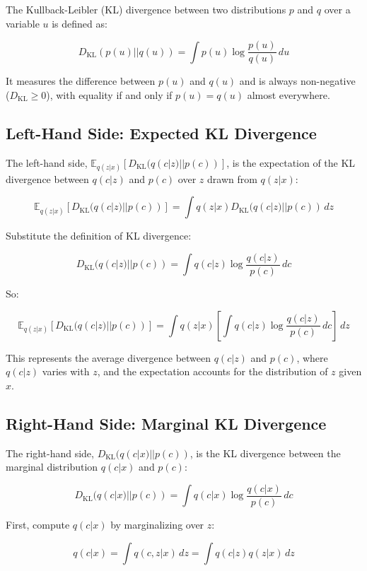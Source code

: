 \documentclass[12pt]{article}
\numberwithin{equation}{section}
\begin{document}
The Kullback-Leibler (KL) divergence between two distributions \( p \) and \( q \) over a variable \( u \) is defined as:

\[
D_{\text{KL}}(p(u) || q(u)) = \int p(u) \log \frac{p(u)}{q(u)} \, du
\]

It measures the difference between \( p(u) \) and \( q(u) \) and is always non-negative (\( D_{\text{KL}} \geq 0 \)), with equality if and only if \( p(u) = q(u) \) almost everywhere.

\subsection{Left-Hand Side: Expected KL Divergence}

The left-hand side, \(\mathbb{E}_{q(z|x)} \left[ D_{\text{KL}}(q(c|z) || p(c)) \right]\), is the expectation of the KL divergence between \( q(c|z) \) and \( p(c) \) over \( z \) drawn from \( q(z|x) \):

\[
\mathbb{E}_{q(z|x)} \left[ D_{\text{KL}}(q(c|z) || p(c)) \right] = \int q(z|x) D_{\text{KL}}(q(c|z) || p(c)) \, dz
\]

Substitute the definition of KL divergence:

\[
D_{\text{KL}}(q(c|z) || p(c)) = \int q(c|z) \log \frac{q(c|z)}{p(c)} \, dc
\]

So:

\[
\mathbb{E}_{q(z|x)} \left[ D_{\text{KL}}(q(c|z) || p(c)) \right] = \int q(z|x) \left[ \int q(c|z) \log \frac{q(c|z)}{p(c)} \, dc \right] \, dz
\]

This represents the average divergence between \( q(c|z) \) and \( p(c) \), where \( q(c|z) \) varies with \( z \), and the expectation accounts for the distribution of \( z \) given \( x \).

\subsection{Right-Hand Side: Marginal KL Divergence}

The right-hand side, \( D_{\text{KL}}(q(c|x) || p(c)) \), is the KL divergence between the marginal distribution \( q(c|x) \) and \( p(c) \):

\[
D_{\text{KL}}(q(c|x) || p(c)) = \int q(c|x) \log \frac{q(c|x)}{p(c)} \, dc
\]

First, compute \( q(c|x) \) by marginalizing over \( z \):

\[
q(c|x) = \int q(c, z | x) \, dz = \int q(c|z) q(z|x) \, dz
\]
\end{document}
